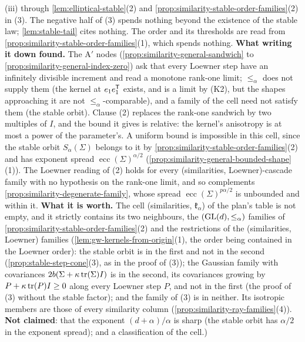 \begin{proposition}
{(iii) through \ref{lem:elliptical-stable}(2) and
\ref{prop:similarity-stable-order-families}(2) in (3). The negative half of (3) spends nothing beyond the
existence of the stable law; \ref{lem:stable-tail} cites nothing. The order and its thresholds are read
from \ref{prop:similarity-stable-order-families}(1), which spends nothing. \textbf{What writing it down
found.} The A$'$ nodes (\ref{prop:similarity-general-sandwich} to
\ref{prop:similarity-general-index-zero}) ask that every Loewner step have an infinitely divisible
increment and read a monotone rank-one limit; $\le_\alpha$ does not supply them (the kernel at
$e_1e_1^{\mathsf{T}}$ exists, and is a limit by (K2), but the shapes approaching it are not
$\le_\alpha$-comparable), and a family of the cell need not satisfy them (the stable orbit). Clause (2) replaces the
rank-one sandwich by two multiples of $I$, and the bound it gives is relative: the kernel's anisotropy is
at most a power of the parameter's. A uniform bound is impossible in this cell, since the stable orbit
$S_\alpha(\Sigma)$ belongs to it by \ref{prop:similarity-stable-order-families}(2) and has exponent spread $\operatorname{ecc}(\Sigma)^{\alpha/2}$
(\ref{prop:similarity-general-bounded-shape}(1)). The Loewner reading of (2) holds for every
(similarities, Loewner)-cascade family with no hypothesis on the rank-one limit, and so complements
\ref{prop:similarity-degenerate-family}, whose spread $\operatorname{ecc}(\Sigma)^{p\alpha/2}$ is unbounded
and within it. \textbf{What it is worth.} The cell (similarities, $\mathfrak k_\alpha$) of the plan's table is not
empty, and it strictly contains its two neighbours, the $(\mathrm{GL}(d), \le_\alpha)$ families of
\ref{prop:similarity-stable-order-families}(2) and the
restrictions of the (similarities, Loewner) families (\ref{lem:gw-kernels-from-origin}(1), the order being
contained in the Loewner order): the stable orbit is in the first and not in the second
(\ref{prop:stable-step-cone}(3), as in the proof of (3)); the Gaussian family with covariances
$2b(\Sigma + \kappa\operatorname{tr}(\Sigma)I)$ is in the second, its covariances growing by $P + \kappa\operatorname{tr}(P)I \ge 0$
along every Loewner step $P$, and not in the first (the proof of (3) without the stable factor); and the family of (3) is in neither. Its isotropic members are those of every similarity
column (\ref{prop:similarity-ray-families}(4)). \textbf{Not claimed}: that the exponent
$(d+\alpha)/\alpha$ is sharp (the stable orbit has $\alpha/2$ in the exponent spread); and a
classification of the cell.)}
\end{proposition}

